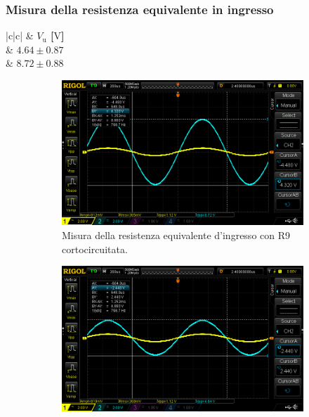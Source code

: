 \documentclass[a4paper]{article}
\begin{document}
			\subsubsection{Misura della resistenza equivalente in ingresso}
				\begin{center}
					\begin{tabular}{ |c|c| }
						\hline
						\multirow{} 						 & \textbf{$ V_{\mathrm{u}} $ [$ \mathrm{V} $]} \\
						\hline
								 & $ 4.64 \pm 0.87 $ \\
						 & $ 8.72 \pm 0.88 $ \\
						\hline
					\end{tabular}
				\end{center}
				\begin{figure}[h!]
					\centering
					\begin{subfigure}{0.4\textwidth}
						\centering
						\includegraphics[scale=0.2]{misuraDellaResistenzaEquivalenteInIngressoAmplificatoreNonInvertenteR9InCorto}
						\caption{Misura della resistenza equivalente d'ingresso con R9 cortocircuitata.}
					\end{subfigure}
					\begin{subfigure}{0.4\textwidth}
						\centering
						\includegraphics[scale=0.2]{misuraDellaResistenzaEquivalenteInIngressoAmplificatoreNonInvertenteR9Inserita}

\end{subfigure}
\end{figure}
\end{document}
